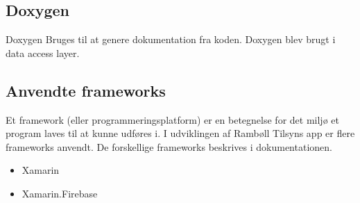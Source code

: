 \subsection*{Doxygen}
Doxygen \cite{DoxygenInfo} Bruges til at genere dokumentation fra koden. Doxygen blev brugt i data access layer.   

\subsection*{Anvendte frameworks} 
Et framework (eller programmeringsplatform) er en betegnelse for det miljø 
et program laves til at kunne udføres i. I udviklingen af Rambøll Tilsyns app
er flere frameworks anvendt. De forskellige frameworks beskrives i dokumentationen.
\begin{itemize}[-]
	\item Xamarin \cite{XamarinDoc}
	\item Xamarin.Firebase \cite{FirebaseDoc}
	
	
\end{itemize}
